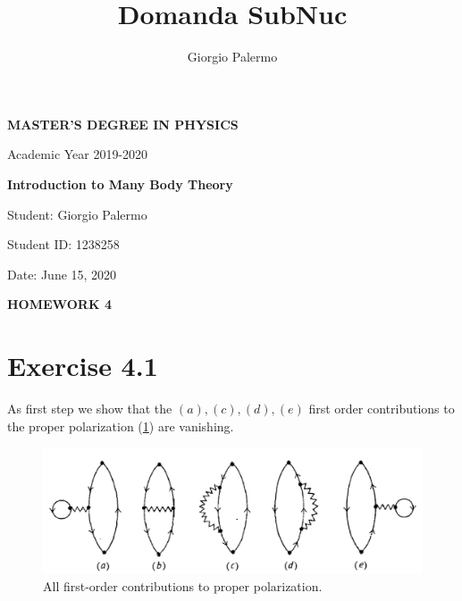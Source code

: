 \documentclass[a4paper]{article}
\title{Domanda SubNuc}
\author{Giorgio Palermo}
\begin{document}
\hypersetup{linkcolor = black}
\hypersetup{linkcolor = blue}

\begin{center}
    \textbf{MASTER'S DEGREE IN PHYSICS}
    
    Academic Year 2019-2020
    
    \medskip
    \textbf{Introduction to Many Body Theory}
\end{center}

\vspace{0.8cm}
Student: Giorgio Palermo

Student ID: 1238258

Date: June 15, 2020

\bigskip

\begin{center}
\textbf{HOMEWORK 4}
\end{center}

\section*{Exercise 4.1}
As first step we show that the $(a), (c), (d), (e)$ first order contributions to the proper polarization (\ref{fig:first_order}) are vanishing.

\begin{figure}[h]
\centering
\includegraphics[width = .7\textwidth]{First_order.png}
\caption{All first-order contributions to proper polarization.}
\label{fig:first_order}
\end{figure}
\end{document}
